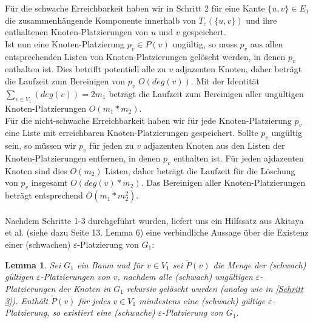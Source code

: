 \documentclass[a4paper, 12pt, twoside]{article}
\theoremstyle{Format1} %
\newtheorem{Lem}[Def]{Lemma}                %
\begin{document}
Für die schwache Erreichbarkeit haben wir in Schritt 2 für eine Kante $\{u,v\} \in E_1$ die zusammenhängende Komponente innerhalb von $T_{\varepsilon}(\{u,v\})$
und ihre enthaltenen Knoten-Platzierungen von $u$ und $v$ gespeichert.
\\
Ist nun eine Knoten-Platzierung $p_v \in P(v)$ ungültig, so muss $p_v$ aus allen entsprechenden Listen von Knoten-Platzierungen gelöscht werden, in
denen $p_v$ enthalten ist. Dies betrifft potentiell alle zu $v$ adjazenten Knoten, daher beträgt die Laufzeit zum Bereinigen von $p_v$ $O(deg(v))$.
Mit der Identität $\sum_{v \in V_1}(deg(v)) = 2m_1$ beträgt die Laufzeit zum Bereinigen aller ungültigen Knoten-Platzierungen $O(m_1*m_2)$.
\\
Für die nicht-schwache Erreichbarkeit haben wir für jede Knoten-Platzierung $p_v$ eine Liste mit erreichbaren Knoten-Platzierungen gespeichert.
Sollte $p_v$ ungültig sein, so müssen wir $p_v$ für jeden zu $v$ adjazenten Knoten aus den Listen der Knoten-Platzierungen entfernen, in denen $p_v$ enthalten ist.
Für jeden ajdazenten Knoten sind dies $O(m_2)$ Listen, daher beträgt die Laufzeit für die Löschung von $p_v$ insgesamt $O(deg(v)*m_2)$.
Das Bereinigen aller Knoten-Platzierungen beträgt entsprechend $O(m_1*m_2^2)$.
\\
\\
Nachdem Schritte 1-3 durchgeführt wurden, liefert uns ein Hilfssatz aus Akitaya et al. (siehe dazu Seite 13. Lemma 6) eine verbindliche Aussage über die Existenz
einer (schwachen) $\varepsilon$-Platzierung von $G_1$:

\begin{Lem} \label {Lemma 1}
	Sei $G_1$ ein Baum und für $v \in V_1$ sei $\tilde{P}(v)$ die Menge der (schwach) gültigen $\varepsilon$-Platzierungen von $v$, nachdem
	alle (schwach) ungültigen $\varepsilon$-Platzierungen der Knoten in $G_1$ rekursiv gelöscht wurden (analog wie in \ref{Schritt 3}).
	Enthält $\tilde{P}(v)$ für jedes $v \in V_1$ mindestens eine (schwach) gültige $\varepsilon$-Platzierung, so existiert
	eine (schwache) $\varepsilon$-Platzierung von $G_1$.
\end{Lem}
\end{document}
